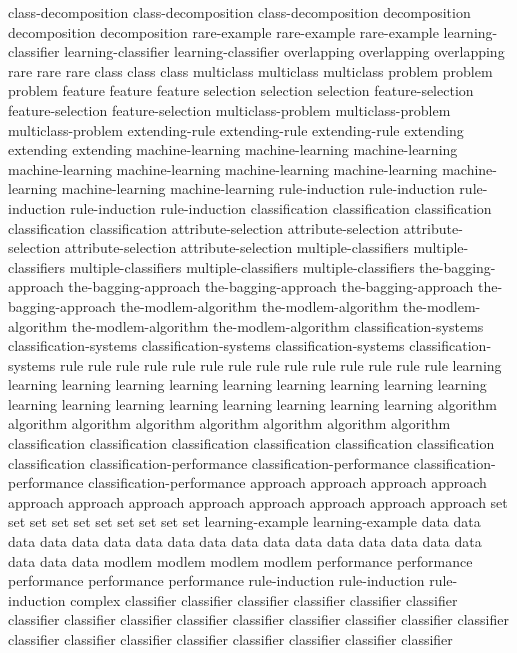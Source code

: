 class-decomposition	class-decomposition	class-decomposition	
decomposition	decomposition	decomposition	
rare-example	rare-example	rare-example	
learning-classifier	learning-classifier	learning-classifier	
overlapping	overlapping	overlapping	
rare	rare	rare	
class	class	class	
multiclass	multiclass	multiclass	
problem	problem	problem	
feature	feature	feature	
selection	selection	selection	
feature-selection	feature-selection	feature-selection	
multiclass-problem	multiclass-problem	multiclass-problem	
extending-rule	extending-rule	extending-rule	
extending	extending	extending	
machine-learning	machine-learning	machine-learning	machine-learning	machine-learning	machine-learning	machine-learning	machine-learning	machine-learning	machine-learning	
rule-induction	rule-induction	rule-induction	rule-induction	rule-induction	
classification	classification	classification	classification	classification	
attribute-selection	attribute-selection	attribute-selection	attribute-selection	attribute-selection	
multiple-classifiers	multiple-classifiers	multiple-classifiers	multiple-classifiers	multiple-classifiers	
the-bagging-approach	the-bagging-approach	the-bagging-approach	the-bagging-approach	the-bagging-approach	
the-modlem-algorithm	the-modlem-algorithm	the-modlem-algorithm	the-modlem-algorithm	the-modlem-algorithm	
classification-systems	classification-systems	classification-systems	classification-systems	classification-systems	
rule	rule	rule	rule	rule	rule	rule	rule	rule	rule	rule	rule	rule	rule	
learning	learning	learning	learning	learning	learning	learning	learning	learning	learning	learning	learning	learning	learning	learning	learning	learning	learning	
algorithm	algorithm	algorithm	algorithm	algorithm	algorithm	algorithm	algorithm	
classification	classification	classification	classification	classification	classification	classification	
classification-performance	classification-performance	classification-performance	classification-performance	
approach	approach	approach	approach	approach	approach	approach	approach	approach	approach	approach	approach	
set	set	set	set	set	set	set	set	set	set	
learning-example	learning-example	
data	data	data	data	data	data	data	data	data	data	data	data	data	data	data	data	data	data	data	data	
modlem	modlem	modlem	modlem	
performance	performance	performance	performance	performance	
rule-induction	rule-induction	rule-induction	
complex	
classifier	classifier	classifier	classifier	classifier	classifier	classifier	classifier	classifier	classifier	classifier	classifier	classifier	classifier	classifier	classifier	classifier	classifier	classifier	classifier	classifier	classifier	classifier	
